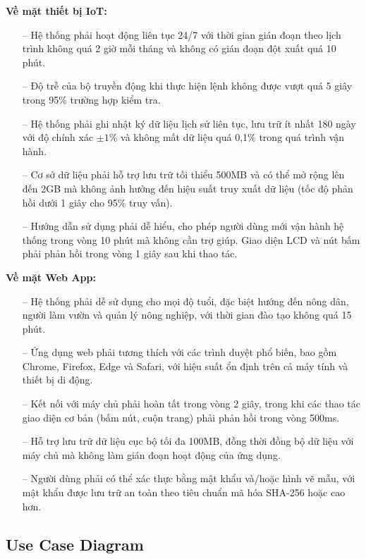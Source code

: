 \textbf{Về mặt thiết bị IoT:}
\begin{itemize}
    \item [--] Hệ thống phải hoạt động liên tục 24/7 với thời gian gián đoạn theo lịch trình không quá 2 giờ mỗi tháng và không có gián đoạn đột xuất quá 10 phút.
    \item [--] Độ trễ của bộ truyền động khi thực hiện lệnh không được vượt quá 5 giây trong 95\% trường hợp kiểm tra.
    \item [--] Hệ thống phải ghi nhật ký dữ liệu lịch sử liên tục, lưu trữ ít nhất 180 ngày với độ chính xác $\pm 1\%$ và không mất dữ liệu quá 0,1\% trong quá trình vận hành.
    \item [--] Cơ sở dữ liệu phải hỗ trợ lưu trữ tối thiểu 500MB và có thể mở rộng lên đến 2GB mà không ảnh hưởng đến hiệu suất truy xuất dữ liệu (tốc độ phản hồi dưới 1 giây cho 95\% truy vấn).
    \item [--] Hướng dẫn sử dụng phải dễ hiểu, cho phép người dùng mới vận hành hệ thống trong vòng 10 phút mà không cần trợ giúp. Giao diện LCD và nút bấm phải phản hồi trong vòng 1 giây sau khi thao tác.
\end{itemize}

\textbf{Về mặt Web App:}
\begin{itemize}
    \item [--] Hệ thống phải dễ sử dụng cho mọi độ tuổi, đặc biệt hướng đến nông dân, người làm vườn và quản lý nông nghiệp, với thời gian đào tạo không quá 15 phút.
    \item [--] Ứng dụng web phải tương thích với các trình duyệt phổ biến, bao gồm Chrome, Firefox, Edge và Safari, với hiệu suất ổn định trên cả máy tính và thiết bị di động.
    \item [--] Kết nối với máy chủ phải hoàn tất trong vòng 2 giây, trong khi các thao tác giao diện cơ bản (bấm nút, cuộn trang) phải phản hồi trong vòng 500ms.
    \item [--] Hỗ trợ lưu trữ dữ liệu cục bộ tối đa 100MB, đồng thời đồng bộ dữ liệu với máy chủ mà không làm gián đoạn hoạt động của ứng dụng.
    \item [--] Người dùng phải có thể xác thực bằng mật khẩu và/hoặc hình vẽ mẫu, với mật khẩu được lưu trữ an toàn theo tiêu chuẩn mã hóa SHA-256 hoặc cao hơn.
\end{itemize}

\subsection{Use Case Diagram}
